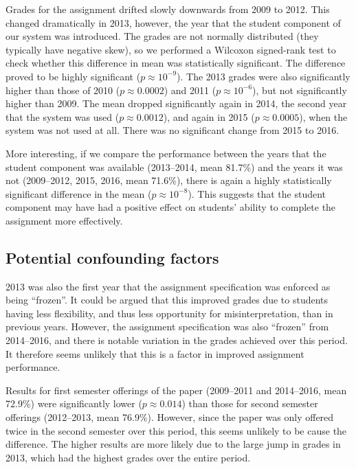 \documentclass[sigconf, authordraft, capitalise]{acmart}
\begin{document}
Grades for the assignment drifted slowly downwards from 2009 to 2012. This changed dramatically in 2013, however, the year that the student component of our system was introduced. The grades are not normally distributed (they typically have negative skew), so we performed a Wilcoxon signed-rank test to check whether this difference in mean was statistically significant. The difference proved to be highly significant (\(p \approx 10^{-9}\)). The 2013 grades were also significantly higher than those of 2010 (\(p \approx 0.0002\)) and 2011 (\(p \approx 10^{-6}\)), but not significantly higher than 2009. The mean dropped significantly again in 2014, the second year that the system was used (\(p \approx 0.0012\)), and again in 2015 (\(p \approx 0.0005\)), when the system was not used at all. There was no significant change from 2015 to 2016.

More interesting, if we compare the performance between the years that the student component was available (2013--2014, mean 81.7\%) and the years it was not (2009--2012, 2015, 2016, mean 71.6\%), there is again a highly statistically significant difference in the mean (\(p \approx 10^{-8}\)). This suggests that the student component may have had a positive effect on students' ability to complete the assignment more effectively.

\subsection{Potential confounding factors}

2013 was also the first year that the assignment specification was enforced as being ``frozen''. It could be argued that this improved grades due to students having less flexibility, and thus less opportunity for misinterpretation, than in previous years. However, the assignment specification was also ``frozen'' from 2014--2016, and there is notable variation in the grades achieved over this period. It therefore seems unlikely that this is a factor in improved assignment performance.

Results for first semester offerings of the paper (2009--2011 and 2014--2016, mean 72.9\%) were significantly lower (\(p \approx 0.014\)) than those for second semester offerings (2012--2013, mean 76.9\%). However, since the paper was only offered twice in the second semester over this period, this seems unlikely to be cause the difference. The higher results are more likely due to the large jump in grades in 2013, which had the highest grades over the entire period.
\end{document}
